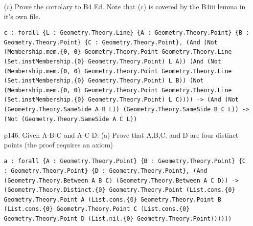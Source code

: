 
\begin{theorem}
  \label{Geometry.Ch3.Ex.Ex1.c}
  \leanok
  (c) Prove the corrolary to B4 Ed. Note that (c) is covered by the B4iii lemma in it's own file. 
\begin{verbatim}c : forall {L : Geometry.Theory.Line} {A : Geometry.Theory.Point} {B : Geometry.Theory.Point} {C : Geometry.Theory.Point}, (And (Not (Membership.mem.{0, 0} Geometry.Theory.Point Geometry.Theory.Line (Set.instMembership.{0} Geometry.Theory.Point) L A)) (And (Not (Membership.mem.{0, 0} Geometry.Theory.Point Geometry.Theory.Line (Set.instMembership.{0} Geometry.Theory.Point) L B)) (Not (Membership.mem.{0, 0} Geometry.Theory.Point Geometry.Theory.Line (Set.instMembership.{0} Geometry.Theory.Point) L C)))) -> (And (Not (Geometry.Theory.SameSide A B L)) (Geometry.Theory.SameSide B C L)) -> (Not (Geometry.Theory.SameSide A C L))\end{verbatim}
\end{theorem}

\begin{theorem}
  \label{Geometry.Ch3.Ex.Ex1.a}
  \leanok
  p146. Given A-B-C and A-C-D: (a) Prove that A,B,C, and D are four distinct points (the proof requires an axiom) 
\begin{verbatim}a : forall {A : Geometry.Theory.Point} {B : Geometry.Theory.Point} {C : Geometry.Theory.Point} {D : Geometry.Theory.Point}, (And (Geometry.Theory.Between A B C) (Geometry.Theory.Between A C D)) -> (Geometry.Theory.Distinct.{0} Geometry.Theory.Point (List.cons.{0} Geometry.Theory.Point A (List.cons.{0} Geometry.Theory.Point B (List.cons.{0} Geometry.Theory.Point C (List.cons.{0} Geometry.Theory.Point D (List.nil.{0} Geometry.Theory.Point))))))\end{verbatim}
\end{theorem}

